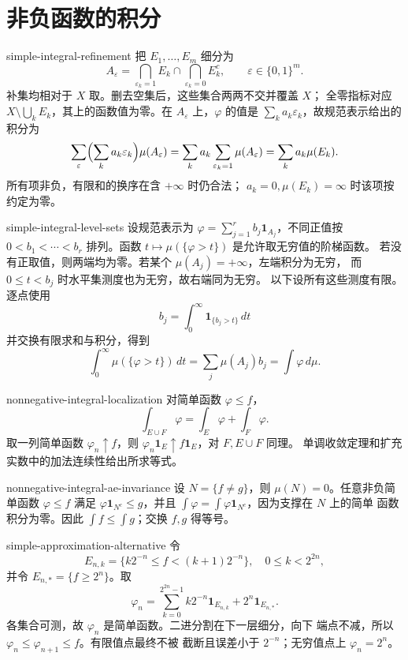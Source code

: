 \chapter{非负函数的积分}

\begin{solution}{simple-integral-refinement}
把 \(E_1,\ldots,E_m\) 细分为
\[
 A_\varepsilon=\bigcap_{\varepsilon_k=1}E_k
 \cap\bigcap_{\varepsilon_k=0}E_k^c,
 \qquad \varepsilon\in\{0,1\}^m.
\]
补集均相对于 \(X\) 取。删去空集后，这些集合两两不交并覆盖 \(X\)；
全零指标对应 \(X\setminus\bigcup_kE_k\)，其上的函数值为零。在
\(A_\varepsilon\) 上，\(\varphi\) 的值是
\(\sum_k a_k\varepsilon_k\)，故规范表示给出的积分为
\[
 \sum_\varepsilon\Bigl(\sum_ka_k\varepsilon_k\Bigr)
 \mu(A_\varepsilon)
 =\sum_ka_k\sum_{\varepsilon_k=1}\mu(A_\varepsilon)
 =\sum_ka_k\mu(E_k).
\]
所有项非负，有限和的换序在含 \(+\infty\) 时仍合法；
\(a_k=0,\mu(E_k)=\infty\) 时该项按约定为零。
\end{solution}

\begin{solution}{simple-integral-level-sets}
设规范表示为
\(\varphi=\sum_{j=1}^rb_j\mathbf1_{A_j}\)，不同正值按
\(0<b_1<\cdots<b_r\) 排列。函数
\(t\mapsto\mu(\{\varphi>t\})\) 是允许取无穷值的阶梯函数。
若没有正取值，则两端均为零。若某个 \(\mu(A_j)=+\infty\)，左端积分为无穷，
而 \(0\le t<b_j\) 时水平集测度也为无穷，故右端同为无穷。
以下设所有这些测度有限。逐点使用
\[
 b_j=\int_0^\infty\mathbf1_{\{b_j>t\}}\,dt
\]
并交换有限求和与积分，得到
\[
 \int_0^\infty\mu(\{\varphi>t\})\,dt
 =\sum_j\mu(A_j)b_j=\int\varphi\,d\mu.
\]
\end{solution}

\begin{solution}{nonnegative-integral-localization}
对简单函数 \(\varphi\le f\)，
\[
 \int_{E\cup F}\varphi=\int_E\varphi+\int_F\varphi.
\]
取一列简单函数 \(\varphi_n\uparrow f\)，则
\(\varphi_n\mathbf1_E\uparrow f\mathbf1_E\)，对 \(F,E\cup F\) 同理。
单调收敛定理和扩充实数中的加法连续性给出所求等式。
\end{solution}

\begin{solution}{nonnegative-integral-ae-invariance}
设 \(N=\{f\ne g\}\)，则 \(\mu(N)=0\)。任意非负简单函数
\(\varphi\le f\) 满足
\(\varphi\mathbf1_{N^c}\le g\)，并且
\(\int\varphi=\int\varphi\mathbf1_{N^c}\)，因为支撑在 \(N\) 上的简单
函数积分为零。因此 \(\int f\le\int g\)；交换 \(f,g\) 得等号。
\end{solution}

\begin{solution}{simple-approximation-alternative}
令
\[
 E_{n,k}=\{k2^{-n}\le f<(k+1)2^{-n}\},
 \quad 0\le k<2^{2n},
\]
并令 \(E_{n,*}=\{f\ge2^n\}\)。取
\[
 \varphi_n=\sum_{k=0}^{2^{2n}-1}k2^{-n}\mathbf1_{E_{n,k}}
 +2^n\mathbf1_{E_{n,*}}.
\]
各集合可测，故 \(\varphi_n\) 是简单函数。二进分割在下一层细分，向下
端点不减，所以 \(\varphi_n\le\varphi_{n+1}\le f\)。有限值点最终不被
截断且误差小于 \(2^{-n}\)；无穷值点上 \(\varphi_n=2^n\)。
\end{solution}

